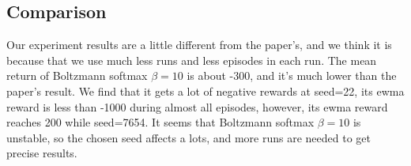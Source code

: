 \subsection*{Comparison}
Our experiment results are a little different from the paper's, and we think it is because that we use much less runs and less episodes in each run.
The mean return of Boltzmann softmax $\beta=10$ is about -300, and it's much lower than the paper's result. We find that it gets a lot of negative
 rewards at seed=22, its ewma reward is less than -1000 during almost all episodes, however, its ewma reward reaches 200 while seed=7654.
It seems that Boltzmann softmax $\beta=10$ is unstable, so the chosen seed affects a lots, and more runs are needed to get precise results.
